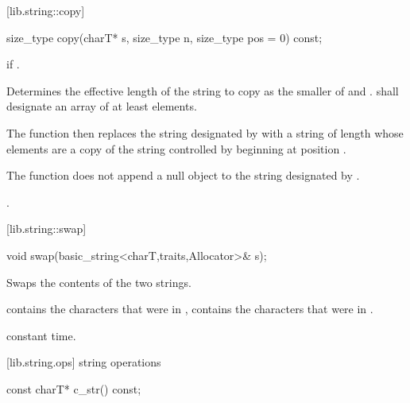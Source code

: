 [lib.string::copy]{}

%
%
\begin{itemdecl}
size_type copy(charT* s, size_type n, size_type pos = 0) const;
\end{itemdecl}

\begin{itemdescr}
\pnum
\requires
{}

\pnum
\throws
{}
if
.

\pnum
\effects
Determines the effective length 
of the string to copy as the smaller of  and
.
 shall designate an array of at least  elements.

The function then replaces the string designated by 
with a string of length  whose elements are a copy of the
string controlled by
beginning at position .

The function does not append a null object to the string designated
by .

\pnum
\returns
{}.
\end{itemdescr}

[lib.string::swap]{}

%
%
\begin{itemdecl}
void swap(basic_string<charT,traits,Allocator>& s);
\end{itemdecl}

\begin{itemdescr}
\pnum
\effects
Swaps the contents of the two strings.

\pnum
\postcondition
{}
contains the characters that were in ,
 contains the characters that were in
.

\pnum
\complexity
constant time.
\end{itemdescr}

[lib.string.ops]{ string operations}

%
\begin{itemdecl}
const charT* c_str() const;
\end{itemdecl}

